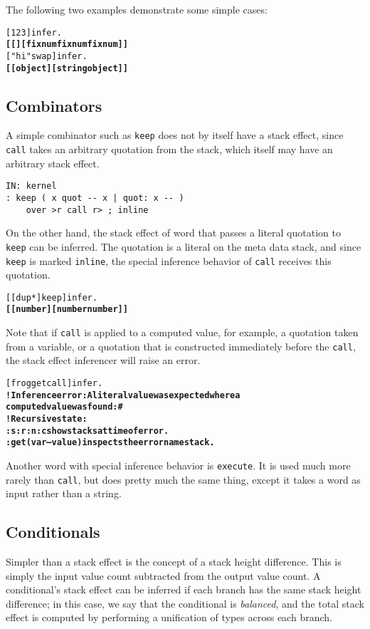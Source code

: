 \documentclass{book}
\begin{document}
The following two examples demonstrate some simple cases:
\begin{alltt}
  [ 1 2 3 ] infer .
\textbf{[ [ ] [ fixnum fixnum fixnum ] ]}
  [ "hi" swap ] infer .
\textbf{[ [ object ] [ string object ] ]}
\end{alltt}

\subsection{Combinators}

A simple combinator such as \verb|keep| does not by itself have a stack effect, since \verb|call| takes an arbitrary quotation from the stack, which itself may have an arbitrary stack effect.
\begin{verbatim}
IN: kernel
: keep ( x quot -- x | quot: x -- )
    over >r call r> ; inline
\end{verbatim}
On the other hand, the stack effect of word that passes a literal quotation to \verb|keep| can be inferred. The quotation is a literal on the meta data stack, and since \verb|keep| is marked \verb|inline|, the special inference behavior of \verb|call| receives this quotation.
\begin{alltt}
  [ [ dup * ] keep ] infer .
\textbf{[ [ number ] [ number number ] ]}
\end{alltt}
Note that if \verb|call| is applied to a computed value, for example, a quotation taken from a variable, or a quotation that is constructed immediately before the \verb|call|, the stack effect inferencer will raise an error.
\begin{alltt}
  [ frog get call ] infer .
\textbf{! Inference error: A literal value was expected where a
computed value was found: \#<computed @ 716167923>
! Recursive state:
:s :r :n :c show stacks at time of error.
:get ( var -- value ) inspects the error namestack.}
\end{alltt}
Another word with special inference behavior is \verb|execute|. It is used much more rarely than \verb|call|, but does pretty much the same thing, except it takes a word as input rather than a string.

\subsection{Conditionals}

Simpler than a stack effect is the concept of a stack height difference. This is simply the input value count subtracted from the output value count. A conditional's stack effect can be inferred if each branch has the same stack height difference; in this case, we say that the conditional is \emph{balanced}, and the total stack effect is computed by performing a unification of types across each branch.
\end{document}
